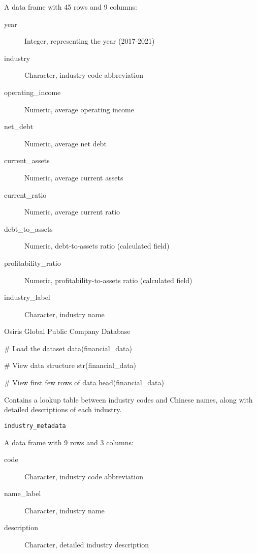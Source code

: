 \documentclass[a4paper]{book}
\begin{document}
\begin{Format}
A data frame with 45 rows and 9 columns:
\begin{description}

\item[year] Integer, representing the year (2017-2021)
\item[industry] Character, industry code abbreviation
\item[operating\_income] Numeric, average operating income
\item[net\_debt] Numeric, average net debt
\item[current\_assets] Numeric, average current assets
\item[current\_ratio] Numeric, average current ratio
\item[debt\_to\_assets] Numeric, debt-to-assets ratio (calculated field)
\item[profitability\_ratio] Numeric, profitability-to-assets ratio (calculated field)
\item[industry\_label] Character, industry name

\end{description}

\end{Format}
%
\begin{Source}
Osiris Global Public Company Database
\end{Source}
%
\begin{Examples}
\begin{ExampleCode}
# Load the dataset
data(financial_data)

# View data structure
str(financial_data)

# View first few rows of data
head(financial_data)

\end{ExampleCode}
\end{Examples}
%
\begin{Description}
Contains a lookup table between industry codes and Chinese names,
along with detailed descriptions of each industry.
\end{Description}
%
\begin{Usage}
\begin{verbatim}
industry_metadata
\end{verbatim}
\end{Usage}
%
\begin{Format}
A data frame with 9 rows and 3 columns:
\begin{description}

\item[code] Character, industry code abbreviation
\item[name\_label] Character, industry name
\item[description] Character, detailed industry description

\end{description}

\end{Format}
\end{document}
